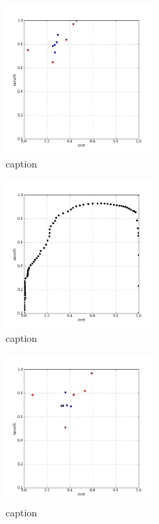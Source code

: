 %
\begin{figure}[!ht]
	\centering
	\includegraphics[width=0.5\textwidth]{img/p1figs/computeFrameStateContrastOnly_sectionCompareBetter_smooth0_tol48.png}
	\caption{caption}
\end{figure}
%
\begin{figure}[!ht]
	\centering
	\includegraphics[width=0.5\textwidth]{img/p1figs/computeFrameStateContrastOnly_sectionCompareBetter_smooth0_tol48_AUC.png}
	\caption{caption}
\end{figure}
%
\begin{figure}[!ht]
	\centering
	\includegraphics[width=0.5\textwidth]{img/p1figs/computeFrameStateContrastOnly_sectionCompareBetter_smooth12_tol24.png}
	\caption{caption}
\end{figure}
